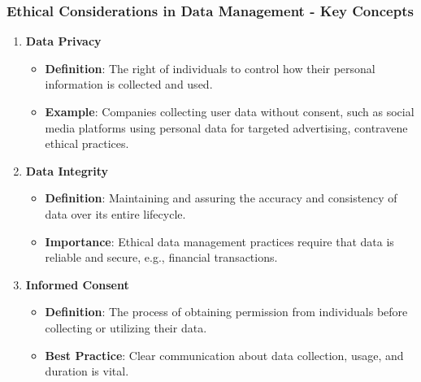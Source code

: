 \documentclass[aspectratio=169]{beamer}
\begin{document}
\begin{frame}[fragile]
    \frametitle{Ethical Considerations in Data Management - Key Concepts}
    \begin{enumerate}
        \item \textbf{Data Privacy}
            \begin{itemize}
                \item \textbf{Definition}: The right of individuals to control how their personal information is collected and used.
                \item \textbf{Example}: Companies collecting user data without consent, such as social media platforms using personal data for targeted advertising, contravene ethical practices.
            \end{itemize}
    
        \item \textbf{Data Integrity}
            \begin{itemize}
                \item \textbf{Definition}: Maintaining and assuring the accuracy and consistency of data over its entire lifecycle.
                \item \textbf{Importance}: Ethical data management practices require that data is reliable and secure, e.g., financial transactions.
            \end{itemize}

        \item \textbf{Informed Consent}
            \begin{itemize}
                \item \textbf{Definition}: The process of obtaining permission from individuals before collecting or utilizing their data.
                \item \textbf{Best Practice}: Clear communication about data collection, usage, and duration is vital.
            \end{itemize}
    \end{enumerate}
\end{frame}
\end{document}

